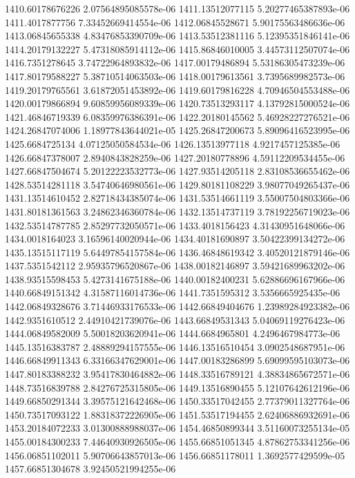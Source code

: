 {1410.60178676226 2.07564895085578e-06
1411.13512077115 5.20277465387893e-06
1411.4017877756 7.33452669414554e-06
1412.06845528671 5.90175563486636e-06
1413.06845655338 4.83476853390709e-06
1413.53512381116 5.12395351846141e-06
1414.20179132227 5.47318085914112e-06
1415.86846010005 3.44573112507074e-06
1416.7351278645 3.74722964893832e-06
1417.00179486894 5.53186305473239e-06
1417.80179588227 5.38710514063503e-06
1418.00179613561 3.7395689982573e-06
1419.20179765561 3.61872051453892e-06
1419.60179816228 4.70946504553488e-06
1420.00179866894 9.60859956089339e-06
1420.73513293117 4.13792815000524e-06
1421.46846719339 6.08359976386391e-06
1422.20180145562 5.46928227276521e-06
1424.26847074006 1.18977843644021e-05
1425.26847200673 5.89096416523995e-06
1425.6684725134 4.07125050584534e-06
1426.13513977118 4.9217457125385e-06
1426.66847378007 2.8940843828259e-06
1427.20180778896 4.59112209534455e-06
1427.66847504674 5.20122223532773e-06
1427.93514205118 2.83108536655462e-06
1428.53514281118 3.54740646980561e-06
1429.80181108229 3.98077049265437e-06
1431.13514610452 2.82718434385074e-06
1431.53514661119 3.55007504803366e-06
1431.80181361563 3.24862346360784e-06
1432.13514737119 3.78192256719023e-06
1432.53514787785 2.85297732050571e-06
1433.4018156423 4.31430951648066e-06
1434.0018164023 3.16596140020944e-06
1434.40181690897 3.50422399134272e-06
1435.13515117119 5.64497854157584e-06
1436.46848619342 3.40520121879146e-06
1437.5351542112 2.95935796520867e-06
1438.00182146897 3.59421689963202e-06
1438.93515598453 5.4273141675188e-06
1440.00182400231 5.62886696167966e-06
1440.66849151342 4.31587116014736e-06
1441.7351595312 3.5356665925435e-06
1442.06849328676 3.71446933176533e-06
1442.66849404676 1.23989284923382e-06
1442.9351610512 2.44910421739076e-06
1443.66849531343 5.04069119276423e-06
1444.06849582009 5.50018203620941e-06
1444.6684965801 4.2496467984773e-06
1445.13516383787 2.48889294157555e-06
1446.13516510454 3.0902548687951e-06
1446.66849911343 6.33166347629001e-06
1447.00183286899 5.69099595103073e-06
1447.80183388232 3.95417830464882e-06
1448.33516789121 4.38834865672571e-06
1448.73516839788 2.84276725315805e-06
1449.13516890455 5.12107642612196e-06
1449.66850291344 3.39575121642468e-06
1450.33517042455 2.77379011327764e-06
1450.73517093122 1.88318372226905e-06
1451.53517194455 2.62406886932691e-06
1453.20184072233 3.01300888988037e-06
1454.46850899344 3.51160073255134e-05
1455.00184300233 7.44640930926505e-06
1455.66851051345 4.87862753341256e-06
1456.06851102011 5.90706643857013e-06
1456.66851178011 1.3692577429599e-05
1457.66851304678 3.92450521994255e-06
}
